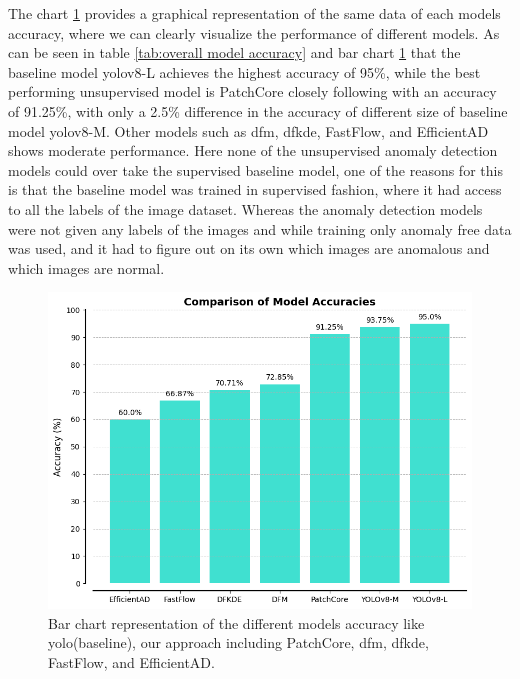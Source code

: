 The chart \ref{fig:bar chart models accruacy} provides a graphical representation of the same data of each models accuracy, where we can clearly visualize the performance of different models. As can be seen in table \ref{tab:overall model accuracy} and bar chart \ref{fig:bar chart models accruacy} that the baseline model \gls{yolo}v8-L achieves the highest accuracy of 95\%, while the best performing unsupervised model is PatchCore closely following with an accuracy of 91.25\%, with only a 2.5\% difference in the accuracy of different size of baseline model \gls{yolo}v8-M. Other models such as \gls{dfm}, \gls{dfkde}, FastFlow, and EfficientAD shows moderate performance. Here none of the unsupervised anomaly detection models could over take the supervised baseline model, one of the reasons for this is that the baseline model was trained in supervised fashion, where it had access to all the labels of the image dataset. Whereas the anomaly detection models were not given any labels of the images and while training only anomaly free data was used, and it had to figure out on its own which images are anomalous and which images are normal.

\begin{figure}[ht!]
    \centering
    \includegraphics[width=1.1\linewidth]{Rohit_Master_Thesis//Images/bar_chart_model_acc.png}
    \caption{Bar chart representation of the different models accuracy like \gls{yolo}(baseline), our approach including PatchCore, \gls{dfm}, \gls{dfkde}, FastFlow, and EfficientAD.}
    \label{fig:bar chart models accruacy}
\end{figure}

